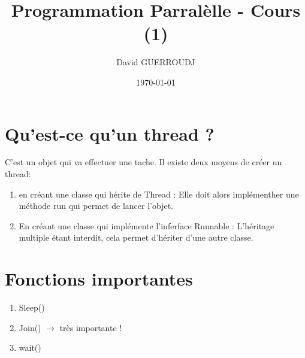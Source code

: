 \documentclass{article}
\title{Programmation Parralèlle - Cours (1)}
\author{David GUERROUDJ}
\date{\today}
\begin{document}
\maketitle %

\tableofcontents %
\vfill\eject

\section{Qu'est-ce qu'un thread ?}
C'est un objet qui va effectuer une tache. Il existe deux moyens de créer un thread:
\begin{enumerate}
\item  en créant une classe qui hérite de Thread :
Elle doit alors implémenther une méthode run qui permet de lancer l'objet.
\item En créant une classe qui implémente l'inferface Runnable : L'héritage multiple étant interdit, cela permet d'hériter d'une autre classe.
\end{enumerate}

\section{Fonctions importantes}
\begin{enumerate}
\item Sleep()
\item Join() $ \rightarrow $ très importante !
\item wait()
\end{enumerate}
\end{document}
